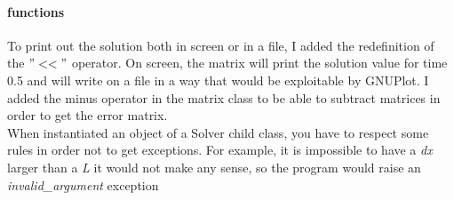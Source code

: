 \documentclass[12pt, a4paper]{report}
\begin{document}
\paragraph{functions}
To print out the solution both in screen or in a file, I added the redefinition of the $"<<"$ operator. On screen, the matrix will print the solution value for time 0.5 and will write on a file in a way that would be exploitable by GNUPlot.
I added the minus operator in the matrix class to be able to subtract matrices in order to get the error matrix. \\When instantiated an object of a Solver child class, you have to respect some rules in order not to get exceptions. For example, it is impossible to have a \textit{dx} larger than a \textit{L} it would not make any sense, so the program would raise an \textit{invalid\_argument} exception
\end{document}
